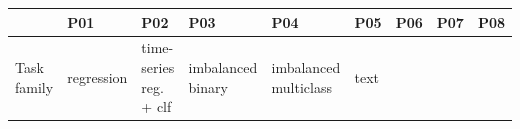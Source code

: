 \documentclass[11pt]{article}
\begin{document}
{\footnotesize
\begin{longtable}[]{@{}lllllllll@{}}
\toprule
\begin{minipage}[b]{0.08\columnwidth}\raggedright
\strut
\end{minipage} & \begin{minipage}[b]{0.08\columnwidth}\raggedright
P01\strut
\end{minipage} & \begin{minipage}[b]{0.08\columnwidth}\raggedright
P02\strut
\end{minipage} & \begin{minipage}[b]{0.08\columnwidth}\raggedright
P03\strut
\end{minipage} & \begin{minipage}[b]{0.08\columnwidth}\raggedright
P04\strut
\end{minipage} & \begin{minipage}[b]{0.08\columnwidth}\raggedright
P05\strut
\end{minipage} & \begin{minipage}[b]{0.08\columnwidth}\raggedright
P06\strut
\end{minipage} & \begin{minipage}[b]{0.08\columnwidth}\raggedright
P07\strut
\end{minipage} & \begin{minipage}[b]{0.08\columnwidth}\raggedright
P08\strut
\end{minipage}\tabularnewline
\midrule
\endhead
\begin{minipage}[t]{0.08\columnwidth}\raggedright
Task family\strut
\end{minipage} & \begin{minipage}[t]{0.08\columnwidth}\raggedright
regression\strut
\end{minipage} & \begin{minipage}[t]{0.08\columnwidth}\raggedright
time-series reg. + clf\strut
\end{minipage} & \begin{minipage}[t]{0.08\columnwidth}\raggedright
imbalanced binary\strut
\end{minipage} & \begin{minipage}[t]{0.08\columnwidth}\raggedright
imbalanced multiclass\strut
\end{minipage} & \begin{minipage}[t]{0.08\columnwidth}\raggedright
text\strut
\end{minipage} & \begin{minipage}[t]{0.08\columnwidth}\raggedright

\end{minipage}
\end{longtable}}
\end{document}
